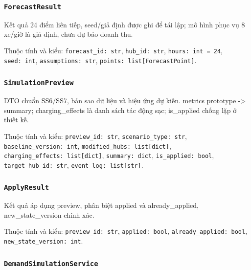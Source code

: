 \documentclass[11pt,a4paper]{article}
\begin{document}
\hypertarget{forecastresult}{%
\subsubsection{\texorpdfstring{\texttt{ForecastResult}}{ForecastResult}}\label{forecastresult}}

Kết quả 24 điểm liên tiếp, seed/giả định được ghi để tái lập; mô hình
phục vụ 8 xe/giờ là giả định, chưa dự báo doanh thu.

Thuộc tính và kiểu: \texttt{forecast\_id:\ str}, \texttt{hub\_id:\ str},
\texttt{hours:\ int\ =\ 24}, \texttt{seed:\ int},
\texttt{assumptions:\ str}, \texttt{points:\ list{[}ForecastPoint{]}}.

\hypertarget{simulationpreview}{%
\subsubsection{\texorpdfstring{\texttt{SimulationPreview}}{SimulationPreview}}\label{simulationpreview}}

DTO chuẩn SS6/SS7, bản sao dữ liệu và hiệu ứng dự kiến. metrics
prototype -\textgreater{} summary; charging\_effects là danh sách tác
động sạc; is\_applied chống lặp ở thiết kế.

Thuộc tính và kiểu: \texttt{preview\_id:\ str},
\texttt{scenario\_type:\ str}, \texttt{baseline\_version:\ int},
\texttt{modified\_hubs:\ list{[}dict{]}},
\texttt{charging\_effects:\ list{[}dict{]}}, \texttt{summary:\ dict},
\texttt{is\_applied:\ bool}, \texttt{target\_hub\_id:\ str},
\texttt{event\_log:\ list{[}str{]}}.

\hypertarget{applyresult}{%
\subsubsection{\texorpdfstring{\texttt{ApplyResult}}{ApplyResult}}\label{applyresult}}

Kết quả áp dụng preview, phân biệt applied và already\_applied,
new\_state\_version chính xác.

Thuộc tính và kiểu: \texttt{preview\_id:\ str}, \texttt{applied:\ bool},
\texttt{already\_applied:\ bool}, \texttt{new\_state\_version:\ int}.

\hypertarget{demandsimulationservice}{%
\subsubsection{\texorpdfstring{\texttt{DemandSimulationService}}{DemandSimulationService}}\label{demandsimulationservice}}
\end{document}
